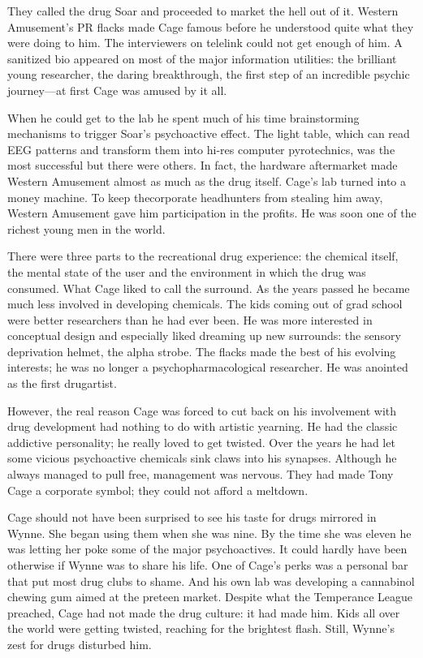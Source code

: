 They called the drug Soar and proceeded to market the hell out of it. Western Amusement's PR flacks made Cage famous before he understood quite what they were doing to him. The interviewers on telelink could not get enough of him. A sanitized bio appeared on most of the major information utilities: the brilliant young researcher, the daring breakthrough, the first step of an incredible psychic journey---at first Cage was amused by it all.

When he could get to the lab he spent much of his time brainstorming mechanisms to trigger Soar's psychoactive effect. The light table, which can read EEG patterns and transform them into hi-res computer pyrotechnics, was the most successful but there were others. In fact, the hardware aftermarket made Western Amusement almost as much as the drug itself. Cage's lab turned into a money machine. To keep thecorporate headhunters from stealing him away, Western Amusement gave him participation in the profits. He was soon one of the richest young men in the world.

There were three parts to the recreational drug experience: the chemical itself, the mental state of the user and the environment in which the drug was consumed. What Cage liked to call the surround. As the years passed he became much less involved in developing chemicals. The kids coming out of grad school were better researchers than he had ever been. He was more interested in conceptual design and especially liked dreaming up new surrounds: the sensory deprivation helmet, the alpha strobe. The flacks made the best of his evolving interests; he was no longer a psychopharmacological researcher. He was anointed as the first drugartist.

However, the real reason Cage was forced to cut back on his involvement with drug development had nothing to do with artistic yearning. He had the classic addictive personality; he really loved to get twisted. Over the years he had let some vicious psychoactive chemicals sink claws into his synapses. Although he always managed to pull free, management was nervous. They had made Tony Cage a corporate symbol; they could not afford a meltdown.

Cage should not have been surprised to see his taste for drugs mirrored in Wynne. She began using them when she was nine. By the time she was eleven he was letting her poke some of the major psychoactives. It could hardly have been otherwise if Wynne was to share his life. One of Cage's perks was a personal bar that put most drug clubs to shame. And his own lab was developing a cannabinol chewing gum aimed at the preteen market. Despite what the Temperance League preached, Cage had not made the drug culture: it had made him. Kids all over the world were getting twisted, reaching for the brightest flash. Still, Wynne's zest for drugs disturbed him.


